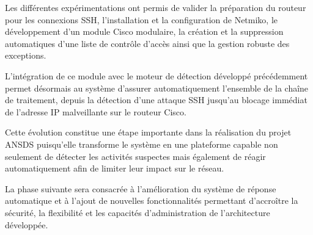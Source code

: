 Les différentes expérimentations ont permis de valider la préparation du routeur pour les connexions SSH, l'installation et la configuration de Netmiko, le développement d'un module Cisco modulaire, la création et la suppression automatiques d'une liste de contrôle d'accès ainsi que la gestion robuste des exceptions.

L'intégration de ce module avec le moteur de détection développé précédemment permet désormais au système d'assurer automatiquement l'ensemble de la chaîne de traitement, depuis la détection d'une attaque SSH jusqu'au blocage immédiat de l'adresse IP malveillante sur le routeur Cisco.

Cette évolution constitue une étape importante dans la réalisation du projet ANSDS puisqu'elle transforme le système en une plateforme capable non seulement de détecter les activités suspectes mais également de réagir automatiquement afin de limiter leur impact sur le réseau.

La phase suivante sera consacrée à l'amélioration du système de réponse automatique et à l'ajout de nouvelles fonctionnalités permettant d'accroître la sécurité, la flexibilité et les capacités d'administration de l'architecture développée.